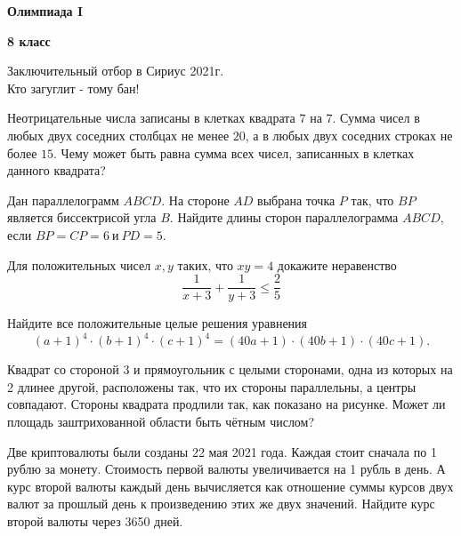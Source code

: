 \centerline{\Huge \bf  Олимпиада I}
\centerline{\Huge \bf 8 класс}

\begin{flushright}
    \scriptsize{Заключительный отбор в Сириус 2021г.\\ Кто загуглит - тому бан!}
\end{flushright}

Неотрицательные числа записаны в клетках квадрата $7$ на $7$. Сумма чисел в любых двух соседних столбцах не менее $20$, а в любых двух соседних строках не более $15$. Чему может быть равна сумма всех чисел, записанных в клетках данного квадрата?

Дан параллелограмм $ABCD$. На стороне $AD$ выбрана точка $P$ так, что $BP$ является биссектрисой угла $B$. Найдите длины сторон параллелограмма $ABCD$, если $BP = CP = 6 \ \text{и} \ PD = 5.$

Для положительных чисел $x, y$ таких, что $xy = 4$ докажите неравенство
\[ \dfrac{1}{x+3} + \dfrac{1}{y+3} \leq \dfrac{2}{5}\]

Найдите все положительные целые решения уравнения
\[(a+1)^4 \cdot (b+1)^4 \cdot (c+1)^4 =(40a+1)\cdot(40b+1)\cdot(40c+1).\]

Квадрат со стороной 3 и прямоугольник с целыми сторонами, одна из которых на 2 длинее другой, расположены так, что их стороны параллельны, а центры совпадают. Стороны квадрата продлили так, как показано на рисунке. Может ли площадь заштрихованной области быть чётным числом?

Две криптовалюты были созданы 22 мая 2021 года. Каждая стоит сначала по 1 рублю за монету. Стоимость первой валюты увеличивается на 1 рубль в день. А курс второй валюты каждый день вычисляется как отношение суммы курсов двух валют за прошлый день к произведению этих же двух значений. Найдите курс второй валюты через 3650 дней.